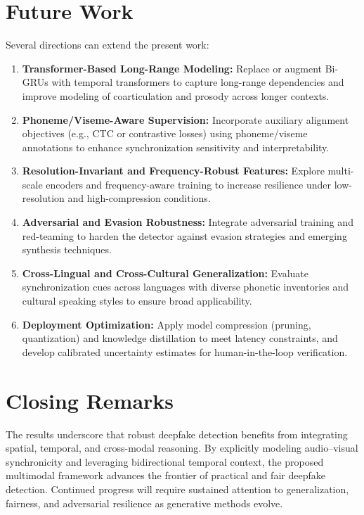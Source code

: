 \section{Future Work}
Several directions can extend the present work:
\begin{enumerate}
    \item \textbf{Transformer-Based Long-Range Modeling:} Replace or augment Bi-GRUs with temporal transformers to capture long-range dependencies and improve modeling of coarticulation and prosody across longer contexts.
    \item \textbf{Phoneme/Viseme-Aware Supervision:} Incorporate auxiliary alignment objectives (e.g., CTC or contrastive losses) using phoneme/viseme annotations to enhance synchronization sensitivity and interpretability.
    \item \textbf{Resolution-Invariant and Frequency-Robust Features:} Explore multi-scale encoders and frequency-aware training to increase resilience under low-resolution and high-compression conditions.
    \item \textbf{Adversarial and Evasion Robustness:} Integrate adversarial training and red-teaming to harden the detector against evasion strategies and emerging synthesis techniques.
    \item \textbf{Cross-Lingual and Cross-Cultural Generalization:} Evaluate synchronization cues across languages with diverse phonetic inventories and cultural speaking styles to ensure broad applicability.
    \item \textbf{Deployment Optimization:} Apply model compression (pruning, quantization) and knowledge distillation to meet latency constraints, and develop calibrated uncertainty estimates for human-in-the-loop verification.
\end{enumerate}

\section{Closing Remarks}
The results underscore that robust deepfake detection benefits from integrating spatial, temporal, and cross-modal reasoning. By explicitly modeling audio--visual synchronicity and leveraging bidirectional temporal context, the proposed multimodal framework advances the frontier of practical and fair deepfake detection. Continued progress will require sustained attention to generalization, fairness, and adversarial resilience as generative methods evolve.